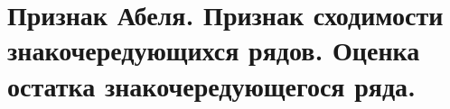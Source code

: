 {
	\section{Признак Абеля. Признак сходимости знакочередующихся рядов. Оценка остатка знакочередующегося ряда.}

	\newpage
}